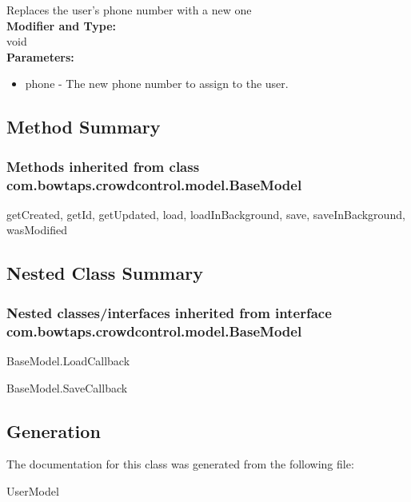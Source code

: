 Replaces the user's phone number with a new one\\

\textbf{Modifier and Type:}\\
\tab void\\


\textbf{Parameters:}
\begin{itemize}
\item phone - The new phone number to assign to the user.
\end{itemize}


\subsection{Method Summary}

\subsubsection{Methods inherited from class com.bowtaps.crowdcontrol.model.BaseModel}

getCreated, getId, getUpdated, load, loadInBackground, save, saveInBackground, wasModified\\




\subsection{Nested Class Summary}

\subsubsection{Nested classes/interfaces inherited from interface com.bowtaps.crowdcontrol.model.BaseModel}
\begin{DoxyCompactItemize}
\item  \hypertarget{class_BaseModel.Android.LoadCallBack}{BaseModel.LoadCallback}
\item  \hypertarget{class_BaseModel.Android.SaveCallback}{BaseModel.SaveCallback}
\end{DoxyCompactItemize} 




\subsection{Generation}
The documentation for this class was generated from the following file\-:
\begin{DoxyCompactItemize}
\item UserModel
\end{DoxyCompactItemize} 









